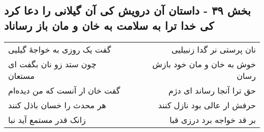 \begin{center}
\section*{بخش ۳۹ - داستان آن درویش کی آن گیلانی را دعا کرد  کی خدا ترا به سلامت به خان و مان باز رساناد}
\label{sec:sh039}
\begin{longtable}{l p{0.5cm} r}
گفت یک روزی به خواجهٔ گیلیی
&&
نان پرستی نر گدا زنبیلیی
\\
چون ستد زو نان بگفت ای مستعان
&&
خوش به خان و مان خود بازش رسان
\\
گفت خان ار آنست که من دیده‌ام
&&
حق ترا آنجا رساند ای دژم
\\
هر محدث را خسان باذل کنند
&&
حرفش ار عالی بود نازل کنند
\\
زانک قدر مستمع آید نبا
&&
بر قد خواجه برد درزی قبا
\\
\end{longtable}
\end{center}
